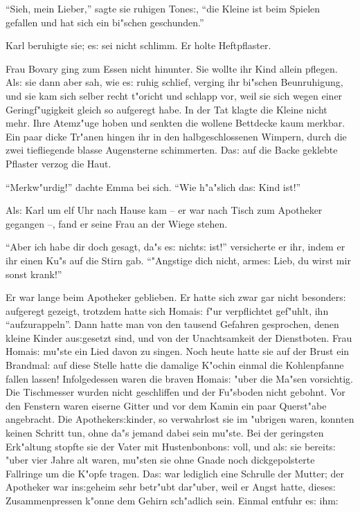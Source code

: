 \documentclass[oneside,12pt]{book}
\newcommand{\s}{s:}%
\begin{document}
"`Sieh, mein Lieber,"' sagte sie ruhigen Tone{\s}, "`die Kleine
ist beim Spielen gefallen und hat sich ein bi"schen geschunden."'

Karl beruhigte sie; e{\s} sei nicht schlimm. Er holte Heftpflaster.

Frau Bovary ging zum Essen nicht hinunter. Sie wollte ihr Kind
allein pflegen. Al{\s} sie dann aber sah, wie e{\s} ruhig schlief,
verging ihr bi"schen Beunruhigung, und sie kam sich selber recht
t"oricht und schlapp vor, weil sie sich wegen einer
Geringf"ugigkeit gleich so aufgeregt habe. In der Tat klagte die
Kleine nicht mehr. Ihre Atemz"uge hoben und senkten die wollene
Bettdecke kaum merkbar. Ein paar dicke Tr"anen hingen ihr in den
halbgeschlossenen Wimpern, durch die zwei tiefliegende blasse
Augensterne schimmerten. Da{\s} auf die Backe geklebte Pflaster
verzog die Haut.

"`Merkw"urdig!"' dachte Emma bei sich. "`Wie h"a"slich da{\s} Kind
ist!"'

Al{\s} Karl um elf Uhr nach Hause kam -- er war nach Tisch zum
Apotheker gegangen --, fand er seine Frau an der Wiege stehen.

"`Aber ich habe dir doch gesagt, da"s e{\s} nicht{\s} ist!"'
versicherte er ihr, indem er ihr einen Ku"s auf die Stirn gab.
"`"Angstige dich nicht, arme{\s} Lieb, du wirst mir sonst krank!"'

Er war lange beim Apotheker geblieben. Er hatte sich zwar gar
nicht besonder{\s} aufgeregt gezeigt, trotzdem hatte sich
Homai{\s} f"ur verpflichtet gef"uhlt, ihn "`aufzurappeln"'. Dann
hatte man von den tausend Gefahren gesprochen, denen kleine Kinder
au{\s}gesetzt sind, und von der Unachtsamkeit der Dienstboten.
Frau Homai{\s} mu"ste ein Lied davon zu singen. Noch heute hatte
sie auf der Brust ein Brandmal: auf diese Stelle hatte die
damalige K"ochin einmal die Kohlenpfanne fallen lassen!
Infolgedessen waren die braven Homai{\s} "uber die Ma"sen
vorsichtig. Die Tischmesser wurden nicht geschliffen und der
Fu"sboden nicht gebohnt. Vor den Fenstern waren eiserne Gitter und
vor dem Kamin ein paar Querst"abe angebracht. Die
Apotheker{\s}kinder, so verwahrlost sie im "ubrigen waren, konnten
keinen Schritt tun, ohne da"s jemand dabei sein mu"ste. Bei der
geringsten Erk"altung stopfte sie der Vater mit Hustenbonbon{\s}
voll, und al{\s} sie bereit{\s} "uber vier Jahre alt waren,
mu"sten sie ohne Gnade noch dickgepolsterte Fallringe um die
K"opfe tragen. Da{\s} war lediglich eine Schrulle der Mutter; der
Apotheker war in{\s}geheim sehr betr"ubt dar"uber, weil er Angst
hatte, diese{\s} Zusammenpressen k"onne dem Gehirn sch"adlich
sein. Einmal entfuhr e{\s} ihm:
\end{document}
